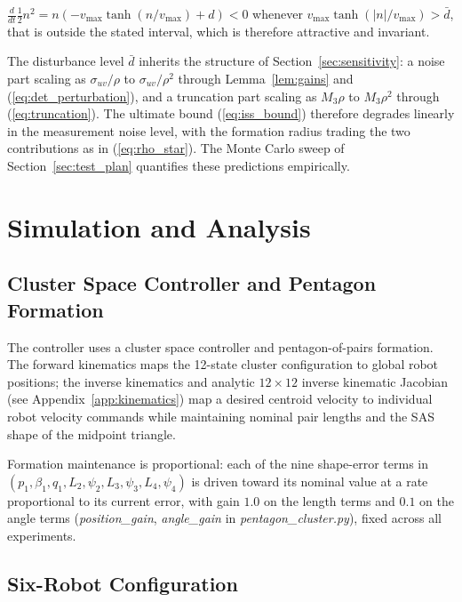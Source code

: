 \documentclass[lettersize,journal]{IEEEtran}
\begin{document}
\begin{IEEEproof}
$\tfrac{d}{dt}\tfrac{1}{2}n^2 = n(-v_{\max}
\tanh(n/v_{\max}) + d) < 0$ whenever $v_{\max}\tanh(|n|/v_{\max}) >
\bar{d}$, that is outside the stated interval, which is therefore
attractive and invariant.
\end{IEEEproof}

The disturbance level $\bar{d}$ inherits the structure
of Section~\ref{sec:sensitivity}: a noise part scaling as
$\sigma_{uv}/\rho$ to $\sigma_{uv}/\rho^2$ through Lemma~\ref{lem:gains}
and (\ref{eq:det_perturbation}), and a truncation part scaling as
$M_3\rho$ to $M_3\rho^2$ through (\ref{eq:truncation}). The ultimate
bound (\ref{eq:iss_bound}) therefore
degrades linearly in the measurement noise level, with the formation
radius trading the two contributions as in (\ref{eq:rho_star}). The
Monte Carlo sweep of Section~\ref{sec:test_plan} quantifies these
predictions empirically.


\section{Simulation and Analysis}
\label{sec:methods}

\subsection{Cluster Space Controller and Pentagon Formation}

The controller uses a cluster space controller and pentagon-of-pairs
formation. The forward kinematics maps the 12-state
cluster configuration to global robot positions; the inverse kinematics
and analytic $12 \times 12$ inverse kinematic Jacobian (see
Appendix~\ref{app:kinematics}) map a desired centroid velocity to
individual robot velocity commands while maintaining nominal pair lengths
and the SAS shape of the midpoint triangle.

Formation maintenance is proportional: each of the nine shape-error
terms in $(p_1, \beta_1, q_1, L_2, \psi_2, L_3, \psi_3, L_4, \psi_4)$ is
driven toward its nominal value at a rate proportional to its current
error, with gain $1.0$ on the length terms and $0.1$ on the angle terms
(\textit{position\_gain}, \textit{angle\_gain} in
\textit{pentagon\_cluster.py}), fixed across all experiments.

\subsection{Six-Robot Configuration}
\end{document}
